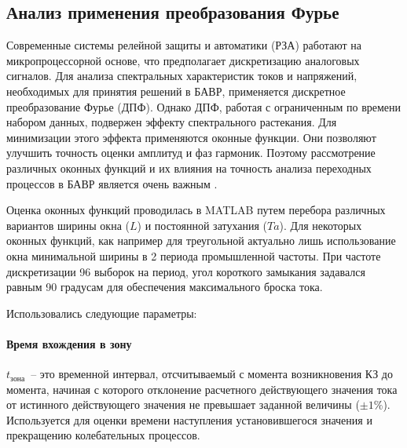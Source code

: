 
\subsection{Анализ применения преобразования Фурье}
\label{sec:ch02_fourier_theory}

Современные системы релейной защиты и автоматики (РЗА) работают на микропроцессорной
основе, что предполагает дискретизацию аналоговых сигналов. Для анализа спектральных
характеристик токов и напряжений, необходимых для принятия решений в БАВР, применяется
дискретное преобразование Фурье (ДПФ). Однако ДПФ, работая с ограниченным по времени
набором данных, подвержен эффекту спектрального растекания. Для минимизации этого
эффекта применяются оконные функции. Они позволяют улучшить точность оценки амплитуд и
фаз гармоник. Поэтому рассмотрение различных оконных функций и их влияния на точность
анализа переходных процессов в БАВР является очень важным
\cite{bavr_bib_036_proakis_2001,bavr_bib_037_oppenheim_1999}.

Оценка оконных функций проводилась в MATLAB путем перебора различных вариантов ширины
окна ($L$) и постоянной затухания ($Ta$). Для некоторых оконных функций, как например
для треугольной актуально лишь использование окна минимальной ширины в 2 периода
промышленной частоты. При частоте дискретизации 96 выборок на период, угол короткого
замыкания задавался равным 90 градусам для обеспечения максимального броска тока.

Использовались следующие параметры:

\paragraph{Время вхождения в зону}

$t_{\text{зона}}$~-- это временной интервал, отсчитываемый с момента возникновения КЗ до момента, начиная с которого отклонение расчетного действующего значения тока от истинного действующего значения не превышает заданной величины ($\pm 1\%$). Используется для оценки времени наступления установившегося значения и прекращению колебательных процессов.

